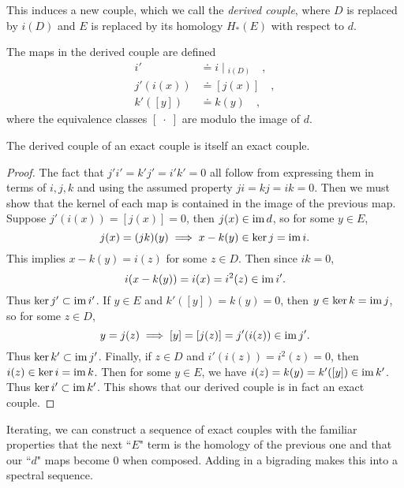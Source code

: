 \documentclass[twoside,10pt]{article}
\begin{document}
This induces a new couple, which we call the \textit{derived couple}, where $D$ is replaced by $i(D)$ and $E$ is replaced by its homology $H_*(E)$ with respect to $d$.
\begin{center}
\end{center}
The maps in the derived couple are defined
\begin{align*}
	i' &\doteq i \;|\;_{i(D)}\quad, \\
	j'(i(x)) &\doteq [j(x)]\quad, \\
	k'([y]) &\doteq k(y)\quad,
\end{align*}
where the equivalence classes $[\;\cdot\;]$ are modulo the image of $d$.

\begin{prop}
	The derived couple of an exact couple is itself an exact couple.
\end{prop}
\begin{proof}
	The fact that $j'i'=k'j'=i'k'=0$ all follow from expressing them in terms of $i,j,k$ and using the assumed property $ji=kj=ik=0$. Then we must show that the kernel of each map is contained in the image of the previous map. Suppose $j'(i(x))=[j(x)]=0$, then $j(x) \in \operatorname{im} d$, so for some $y \in E$,
	\[
		j(x)=(jk)(y) \implies x-k(y) \in \ker j = \operatorname{im} i.
	\] This implies $x-k(y) = i(z)$ for some $z\in D$. Then since $ik=0$,
	\[
		i(x-k(y))=i(x)=i^2(z) \in \operatorname{im} i'.
	\] Thus $\ker j' \subset \operatorname{im} i'$. If $y \in E$ and $k'([y])=k(y)=0$, then $y\in \ker k=\operatorname{im} j$, so for some $z \in D$,
	\[
		y=j(z) \implies [y]=[j(z)]=j'(i(z)) \in \operatorname{im} j'.
	\] Thus $\ker k'\subset \operatorname{im} j'$. Finally, if $z \in D$ and $i'(i(z))=i^2(z)=0$, then $i(z) \in \ker i=\operatorname{im} k$. Then for some $y \in E$, we have $i(z)=k(y)=k'([y]) \in \operatorname{im} k'$. Thus $\ker i' \subset \operatorname{im} k'$. This shows that our derived couple is in fact an exact couple.
\end{proof}

Iterating, we can construct a sequence of exact couples with the familiar properties that the next ``$E$" term is the homology of the previous one and that our ``$d$" maps become 0 when composed. Adding in a bigrading makes this into a spectral sequence.
\end{document}
